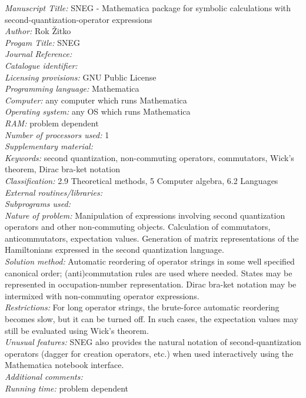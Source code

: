 \documentclass[3p,number,preprint]{elsarticle}
\begin{document}
\begin{small}
\noindent
{\em Manuscript Title:} 
SNEG - Mathematica package for symbolic calculations with
second-quantization-operator expressions \\
{\em Author:}
Rok \v{Z}itko\\
{\em Progam Title:}
SNEG \\
{\em Journal Reference:}
\\
{\em Catalogue identifier:}
\\
{\em Licensing provisions:}
GNU Public License\\
{\em Programming language:}
Mathematica\\
{\em Computer:}
any computer which runs Mathematica\\
{\em Operating system:}
any OS which runs Mathematica\\
{\em RAM:}
problem dependent\\
{\em Number of processors used:}
1\\
{\em Supplementary material:}
\\
{\em Keywords:}
second quantization, non-commuting operators, commutators,
Wick's theorem, Dirac bra-ket notation\\
{\em Classification:}
2.9 Theoretical methods, 5 Computer algebra, 6.2 Languages\\
{\em External routines/libraries:}
\\
{\em Subprograms used:}
\\
{\em Nature of problem:} 
Manipulation of expressions involving second quantization operators
and other non-commuting objects. Calculation of commutators,
anticommutators, expectation values. Generation of matrix
representations of the Hamiltonians expressed in the second quantization
language.\\
{\em Solution method:}
Automatic reordering of operator strings in some well specified
canonical order; (anti)commutation rules are used where needed.
States may be represented in occupation-number representation.
Dirac bra-ket notation may be intermixed with non-commuting operator
expressions.\\
{\em Restrictions:}
For long operator strings, the brute-force automatic reordering becomes
slow, but it can be turned off. In such cases, the expectation values
may still be evaluated using Wick's theorem.\\
{\em Unusual features:}
SNEG also provides the natural notation of second-quantization operators
(dagger for creation operators, etc.) when used
interactively using the Mathematica notebook interface.\\
{\em Additional comments:}
\\
{\em Running time:}
problem dependent\\
\end{small}
\end{document}
